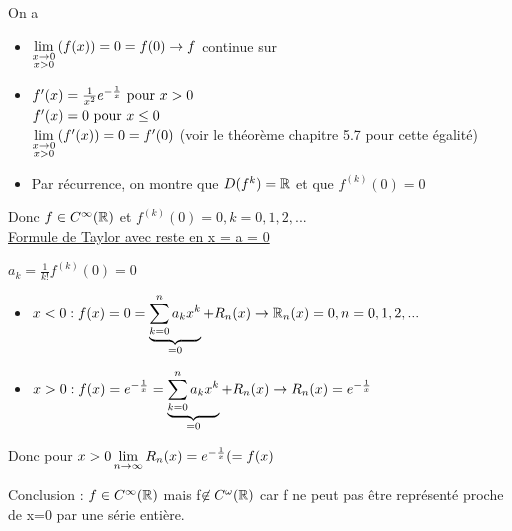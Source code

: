 \documentclass[12pt,a4paper]{article}
\begin{document}
{On a \begin{itemize}
	\item $\llimite{x\to 0}{x>0}{f(x)} = 0 = f(0) \to f$ continue sur \R
	\item $f'(x) = \frac{1}{x^2}e^{-\frac{1}{x}} \pour x >0$\\
	$f'(x) = 0 \pour x \leq 0$\\
	$\llimite{x\to 0}{x>0}{f'(x)} = 0 = f'(0)$ (voir le théorème chapitre 5.7 pour cette égalité)
	\item Par récurrence, on montre que $D(f^k) = \R$ et que $f^{(k)}(0) = 0$\\
\end{itemize}
Donc $f\in C^\infty(\R)$ et $f^{(k)}(0) = 0, k = 0,1,2,...$\\
\underline{Formule de Taylor avec reste en x = a = 0}
\begin{boite}[0.25]
$a_k = \frac{1}{k!}f^{(k)}(0) = 0$
\end{boite}
\begin{itemize}
	\item $x < 0 : f(x) = 0 = \underbrace{\somme{n}{k=0}{a_kx^k}}_{=0} + R_n(x)\\
	\to \R_n(x) = 0, n = 0,1,2,...$
	\item $x > 0 : f(x) = e^{-\frac{1}{x}} = \underbrace{\somme{n}{k=0}{a_kx^k}}_{=0} +R_n(x)\\
	\to R_n(x) = e^{-\frac{1}{x}}$
\end{itemize}
Donc pour $x > 0 \limite{\ninf}R_n(x) = e^{-\frac{1}{x}} (=f(x)$
\begin{boite}
Conclusion : $f\in C^\infty(\R)$ mais f$\not\in C^{\omega}(\R)$ car f ne peut pas être représenté proche de x=0 par une série entière.
\end{boite}

}
\end{document}
